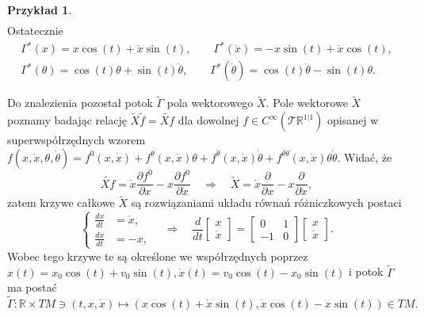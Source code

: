 \documentclass[11pt,a4paper]{report}
\theoremstyle{definition}
\newtheorem{example}[theorem]{Przykład}
\begin{document}
\begin{example}
\begin{equation*}
\begin{gathered}
		\end{gathered}
	\end{equation*}
	Ostatecznie
	\begin{equation*}
		\begin{gathered}\Gamma^*(x)=x\cos(t)+\dot x\sin(t),\qquad\Gamma^*(\dot x)=-x\sin(t)+\dot x\cos(t),\\
			\Gamma^*(\theta)=\cos(t)\theta+\sin(t)\dot\theta,\qquad
			\Gamma^*(\dot \theta)=\cos(t)\dot\theta-\sin(t)\theta.
		\end{gathered}
	\end{equation*}
					      				
	Do znalezienia pozostał potok $\widetilde \Gamma$ pola wektorowego $\widetilde X$. Pole wektorowe $\widetilde X$ poznamy badając relację $\widetilde X \widetilde f = \widetilde{Xf}$ dla dowolnej $f\in C^\infty(\mathcal{T} \mathbb{R}^{1|1})$ opisanej w superwspółrzędnych wzorem $f(x,\dot x,\theta,\dot\theta)=f^0(x,\dot x)+f^\theta(x,\dot x)\theta+f^{\dot\theta}(x,\dot x)\dot\theta+f^{\theta\dot\theta}(x,\dot x)\theta\dot \theta.
	$
	Widać, że
	\begin{equation*}
		\widetilde{Xf} = \dot x \frac{\partial f^0}{\partial x} - x \frac{\partial f^0}{\partial \dot x} \quad \Longrightarrow \quad \widetilde X = \dot x \frac{\partial}{\partial x} - x \frac{\partial}{\partial \dot x},
	\end{equation*}
	zatem krzywe całkowe $\widetilde{X}$ są rozwiązaniami układu równań różniczkowych postaci
	\begin{equation*}
		\left\{\begin{aligned}
		\frac{dx}{dt}&= \dot x, \\
		\frac{d \dot x}{dt}& = -x,
		\end{aligned}\right.\quad\Longrightarrow\quad \frac{d}{dt}\left[\begin{array}{c}x\\ \dot x \end{array}\right]=\left[\begin{array}{cc}0&1\\-1&0\end{array}\right]\left[\begin{array}{c}x\\ \dot x \end{array}\right]\!.
	\end{equation*}
	Wobec tego krzywe te są określone we współrzędnych poprzez $x(t) = x_0 \cos (t) + v_0 \sin (t), \dot x (t) = v_0 \cos (t) - x_0 \sin (t)$ i potok $\widetilde{\Gamma}$ ma postać
	\begin{equation*}
		\widetilde{\Gamma}: \mathbb{R}\times TM \ni (t,x,\dot x) \mapsto (x \cos(t)+\dot x \sin(t), \dot x \cos(t)- x \sin(t))\in TM.
	\end{equation*}
\end{example}
		      			
\end{document}

